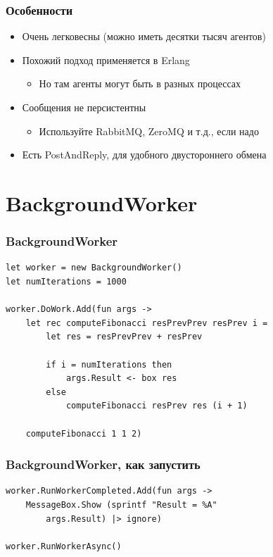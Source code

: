 \documentclass[xetex,mathserif,serif]{beamer}
\begin{document}
    \begin{frame}
        \frametitle{Особенности}
        \begin{itemize}
            \item Очень легковесны (можно иметь десятки тысяч агентов)
            \item Похожий подход применяется в Erlang
            \begin{itemize}
                \item Но там агенты могут быть в разных процессах
            \end{itemize}
            \item Сообщения не персистентны
            \begin{itemize}
                \item Используйте RabbitMQ, ZeroMQ и т.д., если надо
            \end{itemize}
            \item Есть PostAndReply, для удобного двустороннего обмена
        \end{itemize}
    \end{frame}

    \section{BackgroundWorker}

    \begin{frame}[fragile]
        \frametitle{BackgroundWorker}
        \begin{verbatim}
let worker = new BackgroundWorker()
let numIterations = 1000

worker.DoWork.Add(fun args ->
    let rec computeFibonacci resPrevPrev resPrev i =
        let res = resPrevPrev + resPrev
        
        if i = numIterations then
            args.Result <- box res
        else
            computeFibonacci resPrev res (i + 1)

    computeFibonacci 1 1 2)
        \end{verbatim}
\end{frame}

    \begin{frame}[fragile]
        \frametitle{BackgroundWorker, как запустить}
        \begin{verbatim}
worker.RunWorkerCompleted.Add(fun args ->
    MessageBox.Show (sprintf "Result = %A" 
        args.Result) |> ignore)

worker.RunWorkerAsync()
        \end{verbatim}
    \end{frame}
\end{document}

